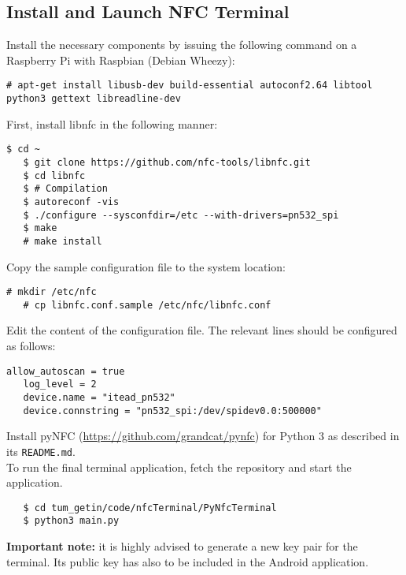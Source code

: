 \subsection{Install and Launch NFC Terminal}
Install the necessary components by issuing the following command on a Raspberry Pi with Raspbian (Debian Wheezy):
\begin{lstlisting}[breaklines=true]
   # apt-get install libusb-dev build-essential autoconf2.64 libtool python3 gettext libreadline-dev
\end{lstlisting}
%
First, install libnfc in the following manner:
\begin{lstlisting}[breaklines=true]
   $ cd ~
   $ git clone https://github.com/nfc-tools/libnfc.git
   $ cd libnfc
   $ # Compilation
   $ autoreconf -vis
   $ ./configure --sysconfdir=/etc --with-drivers=pn532_spi
   $ make
   # make install
\end{lstlisting}
Copy the sample configuration file to the system location:
\begin{lstlisting}[breaklines=true]
   # mkdir /etc/nfc
   # cp libnfc.conf.sample /etc/nfc/libnfc.conf
\end{lstlisting}
%
Edit the content of the configuration file. The relevant lines should be configured as follows:
\begin{lstlisting}[breaklines=true]
   allow_autoscan = true
   log_level = 2
   device.name = "itead_pn532"
   device.connstring = "pn532_spi:/dev/spidev0.0:500000"
\end{lstlisting}
%
Install pyNFC (\url{https://github.com/grandcat/pynfc}) for Python 3 as described in its \texttt{README.md}.
%
\\
\noindent
To run the final terminal application, fetch the \app repository and start the application.
\begin{lstlisting}
   $ cd tum_getin/code/nfcTerminal/PyNfcTerminal
   $ python3 main.py
\end{lstlisting}
%
\textbf{Important note:} it is highly advised to generate a new key pair for the terminal. Its public key has also to be included in the Android application.


%
%
%
%
%



